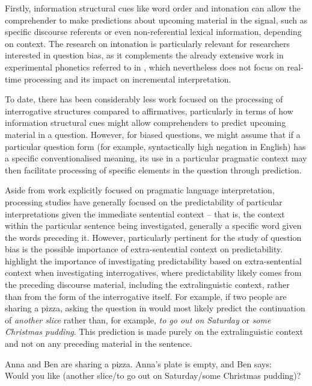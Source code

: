 \documentclass[output=paper,colorlinks,citecolor=brown]{langscibook}
\begin{document}
Firstly, information structural cues like word order \citep[e.g.][]{Kaiser2004, Yano2018} and intonation \citep[e.g][]{kurumada2014or, roettger2019evidential} can allow the comprehender to make predictions about upcoming material in the signal, such as specific discourse referents or even non-referential lexical information, depending on context. The research on intonation is particularly relevant for researchers interested in question bias, as it complements the already extensive work in experimental phonetics referred to in , which nevertheless does not focus on real-time processing and its impact on incremental interpretation.

To date, there has been considerably less work focused on the processing of interrogative structures compared to affirmatives, particularly in terms of how information structural cues might allow comprehenders to predict upcoming material in a question. However, for biased questions, we might assume that if a particular question form (for example, syntactically high negation in English) has a specific conventionalised meaning, its use in a particular pragmatic context may then facilitate processing of specific elements in the question through prediction.

Aside from work explicitly focused on pragmatic language interpretation, processing studies have generally focused on the predictability of particular interpretations given the immediate sentential context -- that is, the context within the particular sentence being investigated, generally a specific word given the words preceding it. However, particularly pertinent for the study of question bias is the possible importance of extra-sentential context on predictability. \citet{Lemke2021} highlight the importance of investigating predictability based on extra-sentential context when investigating interrogatives, where predictability likely comes from the preceding discourse material, including the extralinguistic context, rather than from the form of the interrogative itself. For example, if two people are sharing a pizza, asking the question in  would most likely predict the continuation of \textit{another slice} rather than, for example, \textit{to go out on Saturday} or \textit{some Christmas pudding}. This prediction is made purely on the extralinguistic context and not on any preceding material in the sentence.

\begin{exe}
\ex \label{pizza} Anna and Ben are sharing a pizza. Anna's plate is empty, and Ben says:\\ Would you like (another slice/to go out on Saturday/some Christmas pudding)?
\end{exe}
\end{document}
